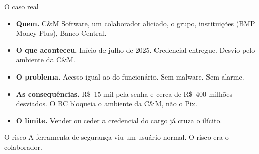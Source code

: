 \begin{frame}{O caso real}
  \scriptsize
  \begin{itemize}
    \item \textbf{Quem.} C\&M Software, um colaborador aliciado, o grupo, instituições (BMP Money Plus), Banco Central.
    \item \textbf{O que aconteceu.} Início de julho de 2025. Credencial entregue. Desvio pelo ambiente da C\&M.
    \item \textbf{O problema.} Acesso igual ao do funcionário. Sem malware. Sem alarme.
    \item \textbf{As consequências.} R\$~15 mil pela senha e cerca de R\$~400 milhões desviados. O BC bloqueia o ambiente da C\&M, não o Pix.
    \item \textbf{O limite.} Vender ou ceder a credencial do cargo já cruza o ilícito.
  \end{itemize}
  \vspace{0.25em}
  \begin{cefetalertblock}{O risco}
    \small
    A ferramenta de segurança viu um usuário normal. O risco era o colaborador.
  \end{cefetalertblock}
\end{frame}
